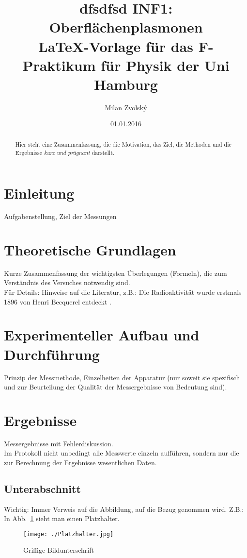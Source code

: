 \documentclass[12pt]{article}
\title{dfsdfsd INF1: Oberfl\"achenplasmonen\\ \LaTeX-Vorlage f\"ur das F-Praktikum f\"ur Physik der Uni Hamburg}
\author{Milan Zvolsk\'y}
\date{01.01.2016}
\begin{document}
\maketitle
\thispagestyle{empty}
\clearpage


\begin{abstract}
Hier steht eine Zusammenfassung, die die Motivation, das Ziel, die Methoden und die Ergebnisse \emph{kurz und pr\"agnant} darstellt.
\end{abstract}

\section{Einleitung}
Aufgabenstellung, Ziel der Messungen

\section{Theoretische Grundlagen}
Kurze Zusammenfassung der wichtigsten \"Uberlegungen (Formeln), die zum Verst\"andnis des Versuches notwendig sind.\\
F\"ur Details: Hinweise auf die Literatur, z.B.:
Die Radioaktivit\"at wurde erstmals 1896 von Henri Becquerel entdeckt \cite{Becquerel:261888}.


\section{Experimenteller Aufbau und Durchf\"uhrung}
Prinzip der Messmethode, Einzelheiten der Apparatur (nur soweit sie spezifisch und zur Beurteilung der Qualit\"at der Messergebnisse von Bedeutung sind).

\section{Ergebnisse}
Messergebnisse mit Fehlerdiskussion.\\
Im Protokoll nicht unbedingt alle Messwerte einzeln auff\"uhren, sondern nur die zur Berechnung der Ergebnisse wesentlichen Daten. \\


\subsection{Unterabschnitt}
Wichtig: Immer Verweis auf die Abbildung, auf die Bezug genommen wird.
Z.B.: In Abb.~\ref{meinlabel1} sieht man einen Platzhalter.

\begin{figure}[h!]
  \centering
  \texttt{[image: ./Platzhalter.jpg]}
  \caption{Griffige Bildunterschrift}
  \label{meinlabel1}
\end{figure}
\end{document}

